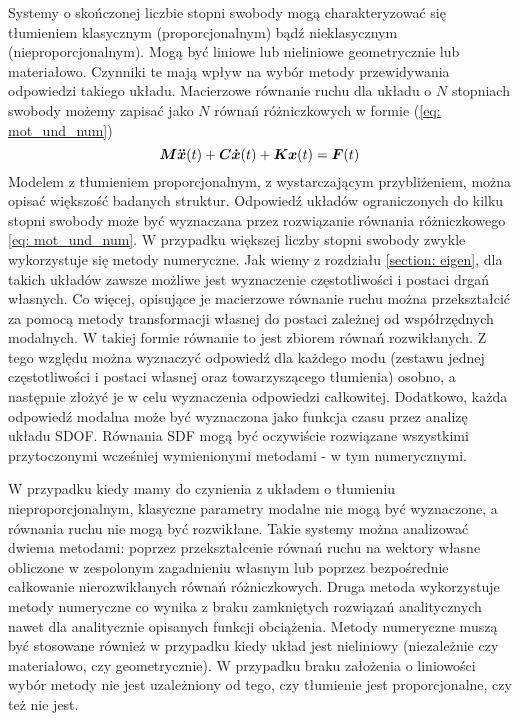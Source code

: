 Systemy o skończonej liczbie stopni swobody mogą charakteryzować się tłumieniem klasycznym (proporcjonalnym) bądź nieklasycznym (nieproporcjonalnym). Mogą być liniowe lub nieliniowe geometrycznie lub materiałowo. Czynniki te mają wpływ na wybór metody przewidywania odpowiedzi takiego układu. Macierzowe równanie ruchu dla układu o $N$ stopniach swobody możemy zapisać jako $N$ równań różniczkowych w formie (\ref{eq: mot_und_num})
\begin{equation} \label{eq: mot_und_num}
	\bm{M} \bm{\ddot{x}}(t) +\bm{C} \bm{\dot{x}}(t)+ \bm{Kx}(t) = \bm{F}(t)
\end{equation}
 Modelem z tłumieniem proporcjonalnym, z wystarczającym przybliżeniem, można opisać większość badanych struktur. Odpowiedź układów ograniczonych do kilku stopni swobody może być wyznaczana przez rozwiązanie równania różniczkowego \ref{eq: mot_und_num}. W przypadku większej liczby stopni swobody zwykle wykorzystuje się metody numeryczne. Jak wiemy z rozdziału \ref{section: eigen}, dla takich układów zawsze możliwe jest wyznaczenie częstotliwości i postaci drgań własnych. Co więcej, opisujące je macierzowe równanie ruchu można przekształcić za pomocą metody transformacji własnej do postaci zależnej od współrzędnych modalnych. W takiej formie równanie to jest zbiorem równań rozwikłanych. Z tego względu można wyznaczyć odpowiedź dla każdego modu (zestawu jednej częstotliwości i postaci własnej oraz towarzyszącego tłumienia) osobno, a następnie złożyć je w celu wyznaczenia odpowiedzi całkowitej. Dodatkowo, każda odpowiedź modalna może być wyznaczona jako funkcja czasu przez analizę układu SDOF. Równania SDF mogą być oczywiście rozwiązane wszystkimi przytoczonymi wcześniej wymienionymi metodami - w tym numerycznymi.
 
 W przypadku kiedy mamy do czynienia z układem o tłumieniu nieproporcjonalnym, klasyczne parametry modalne nie mogą być wyznaczone, a równania ruchu nie mogą być rozwikłane. Takie systemy można analizować dwiema metodami: poprzez przekształcenie równań ruchu na wektory własne obliczone w zespolonym zagadnieniu własnym lub poprzez bezpośrednie całkowanie nierozwikłanych równań różniczkowych. Druga metoda wykorzystuje metody numeryczne co wynika z braku zamkniętych rozwiązań analitycznych nawet dla analitycznie opisanych funkcji obciążenia. Metody numeryczne muszą być stosowane również w przypadku kiedy układ jest nieliniowy (niezależnie czy materiałowo, czy geometrycznie). W przypadku braku założenia o liniowości wybór metody nie jest uzależniony od tego, czy tłumienie jest proporcjonalne, czy też nie jest.
 
